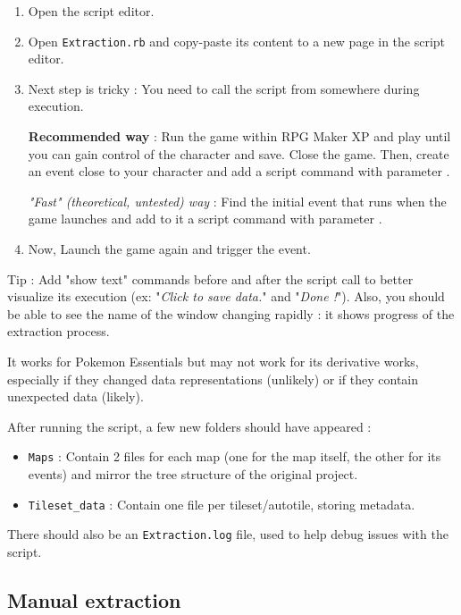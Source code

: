 \documentclass[11pt]{article}
\begin{document}
{\begin{enumerate}
	\item Open the script editor.
	
	\item Open \verb|Extraction.rb| and copy-paste its content to a new page in the script editor.
	
	\item Next step is tricky : You need to call the script from somewhere during execution. 
	
	\textbf{Recommended way} : Run the game within RPG Maker XP and play until you can gain control of the character and save. Close the game. Then, create an event close to your character and add a script command with parameter . 
	
	\textit{"Fast" (theoretical, untested) way} : Find the initial event that runs when the game launches and add to it a script command with parameter .
	
	\item Now, Launch the game again and trigger the event.
\end{enumerate}

Tip : Add "show text" commands before and after the script call to better visualize its execution (ex: "\textit{Click to save data.}" and "\textit{Done !}"). Also, you should be able to see the name of the window changing rapidly : it shows progress of the extraction process.

It works for Pokemon Essentials but may not work for its derivative works, especially if they changed data representations (unlikely) or if they contain unexpected data (likely).

After running the script, a few new folders should have appeared :
\begin{itemize}
	\item \verb|Maps| : Contain 2 files for each map (one for the map itself, the other for its events) and mirror the tree structure of the original project.
	\item \verb|Tileset_data| : Contain one file per tileset/autotile, storing metadata.
\end{itemize}

There should also be an \verb|Extraction.log| file, used to help debug issues with the script.


\newpage

\subsection{Manual extraction}

}
\end{document}
